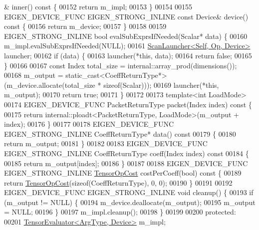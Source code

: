 \begin{DoxyCode}
      & inner()\textcolor{keyword}{ const }\{
00152     \textcolor{keywordflow}{return} m\_impl;
00153   \}
00154 
00155   EIGEN\_DEVICE\_FUNC EIGEN\_STRONG\_INLINE \textcolor{keyword}{const} Device& device()\textcolor{keyword}{ const }\{
00156     \textcolor{keywordflow}{return} m\_device;
00157   \}
00158 
00159   EIGEN\_STRONG\_INLINE \textcolor{keywordtype}{bool} evalSubExprsIfNeeded(Scalar* data) \{
00160     m\_impl.evalSubExprsIfNeeded(NULL);
00161     \hyperlink{struct_eigen_1_1_scan_launcher}{ScanLauncher<Self, Op, Device>} launcher;
00162     \textcolor{keywordflow}{if} (data) \{
00163       launcher(*\textcolor{keyword}{this}, data);
00164       \textcolor{keywordflow}{return} \textcolor{keyword}{false};
00165     \}
00166 
00167     \textcolor{keyword}{const} Index total\_size = internal::array\_prod(dimensions());
00168     m\_output = \textcolor{keyword}{static\_cast<}CoeffReturnType*\textcolor{keyword}{>}(m\_device.allocate(total\_size * \textcolor{keyword}{sizeof}(Scalar)));
00169     launcher(*\textcolor{keyword}{this}, m\_output);
00170     \textcolor{keywordflow}{return} \textcolor{keyword}{true};
00171   \}
00172 
00173   \textcolor{keyword}{template}<\textcolor{keywordtype}{int} LoadMode>
00174   EIGEN\_DEVICE\_FUNC PacketReturnType packet(Index index)\textcolor{keyword}{ const }\{
00175     \textcolor{keywordflow}{return} internal::ploadt<PacketReturnType, LoadMode>(m\_output + index);
00176   \}
00177 
00178   EIGEN\_DEVICE\_FUNC EIGEN\_STRONG\_INLINE CoeffReturnType* data()\textcolor{keyword}{ const}
00179 \textcolor{keyword}{  }\{
00180     \textcolor{keywordflow}{return} m\_output;
00181   \}
00182 
00183   EIGEN\_DEVICE\_FUNC EIGEN\_STRONG\_INLINE CoeffReturnType coeff(Index index)\textcolor{keyword}{ const}
00184 \textcolor{keyword}{  }\{
00185     \textcolor{keywordflow}{return} m\_output[index];
00186   \}
00187 
00188   EIGEN\_DEVICE\_FUNC EIGEN\_STRONG\_INLINE \hyperlink{class_eigen_1_1_tensor_op_cost}{TensorOpCost} costPerCoeff(\textcolor{keywordtype}{bool})\textcolor{keyword}{ const }\{
00189     \textcolor{keywordflow}{return} \hyperlink{class_eigen_1_1_tensor_op_cost}{TensorOpCost}(\textcolor{keyword}{sizeof}(CoeffReturnType), 0, 0);
00190   \}
00191 
00192   EIGEN\_DEVICE\_FUNC EIGEN\_STRONG\_INLINE \textcolor{keywordtype}{void} cleanup() \{
00193     \textcolor{keywordflow}{if} (m\_output != NULL) \{
00194       m\_device.deallocate(m\_output);
00195       m\_output = NULL;
00196     \}
00197     m\_impl.cleanup();
00198   \}
00199 
00200 \textcolor{keyword}{protected}:
00201   \hyperlink{struct_eigen_1_1_tensor_evaluator}{TensorEvaluator<ArgType, Device>} m\_impl;

\end{DoxyCode}
